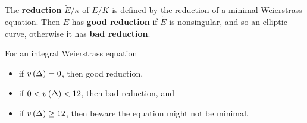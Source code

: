 \begin{definition*}
The \textbf{reduction} $ \widetilde{E} / \kappa $ of $ E / K $ is defined by the reduction of a minimal Weierstrass equation. Then $ E $ has \textbf{good reduction} if $ \widetilde{E} $ is nonsingular, and so an elliptic curve, otherwise it has \textbf{bad reduction}.
\end{definition*}

For an integral Weierstrass equation
\begin{itemize}
\item if $ v\br{\Delta} = 0 $, then good reduction,
\item if $ 0 < v\br{\Delta} < 12 $, then bad reduction, and
\item if $ v\br{\Delta} \ge 12 $, then beware the equation might not be minimal.
\end{itemize}

\pagebreak

